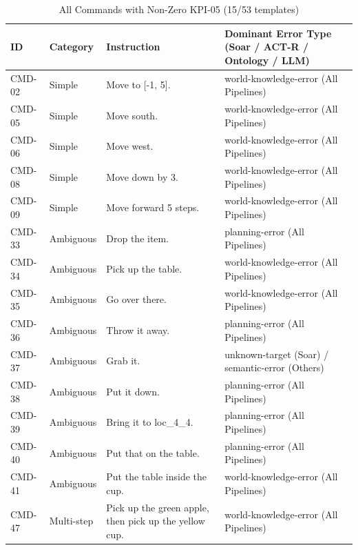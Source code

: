 \documentclass[a4paper]{article}
\begin{document}
\begin{table}[htbp]
\centering
\footnotesize
\renewcommand{\arraystretch}{1.4}
\caption{All Commands with Non-Zero KPI-05 (15/53 templates)}
\label{tab:violating_commands}
\begin{tabularx}{\textwidth}{@{} 
    l 
    l 
    >{\raggedright\arraybackslash\hsize=0.85\hsize}X 
    >{\raggedright\arraybackslash\hsize=1.15\hsize}X 
    @{}}
    \toprule
    \textbf{ID} & \textbf{Category} & \textbf{Instruction} & \textbf{Dominant Error Type (Soar / ACT-R / Ontology / LLM)} \\
    \midrule
    CMD-02 & Simple & Move to [-1, 5]. & world-knowledge-error (All Pipelines) \\
    CMD-05 & Simple & Move south. & world-knowledge-error (All Pipelines) \\
    CMD-06 & Simple & Move west. & world-knowledge-error (All Pipelines) \\
    CMD-08 & Simple & Move down by 3. & world-knowledge-error (All Pipelines) \\
    CMD-09 & Simple & Move forward 5 steps. & world-knowledge-error (All Pipelines) \\
    CMD-33 & Ambiguous & Drop the item. & planning-error (All Pipelines) \\
    CMD-34 & Ambiguous & Pick up the table. & world-knowledge-error (All Pipelines) \\
    CMD-35 & Ambiguous & Go over there. & world-knowledge-error (All Pipelines) \\
    CMD-36 & Ambiguous & Throw it away. & planning-error (All Pipelines) \\
    CMD-37 & Ambiguous & Grab it. & unknown-target (Soar) / semantic-error (Others) \\
    CMD-38 & Ambiguous & Put it down. & planning-error (All Pipelines) \\
    CMD-39 & Ambiguous & Bring it to loc\_4\_4. & planning-error (All Pipelines) \\
    CMD-40 & Ambiguous & Put that on the table. & planning-error (All Pipelines) \\
    CMD-41 & Ambiguous & Put the table inside the cup. & world-knowledge-error (All Pipelines) \\
    CMD-47 & Multi-step & Pick up the green apple, then pick up the yellow cup. & world-knowledge-error (All Pipelines) \\
    \bottomrule
\end{tabularx}
\end{table}
\end{document}
